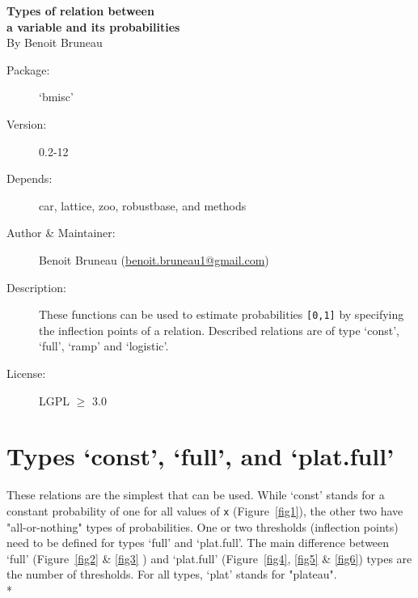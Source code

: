 \documentclass[letterpaper, 12pt]{article}
\begin{document}
\begin{titlepage}
\vspace*{3cm}
\begin{center}

\huge{\bf Types of relation between \\ a variable and its probabilities}\\

\vspace*{2cm}
\large{By Benoit Bruneau}
\end{center}
\vspace*{4cm}

\begin{description}
\item[Package:] `bmisc'
\item[Version:] 0.2-12
\item[Depends:] car, lattice, zoo, robustbase, and methods
\item[Author \& Maintainer:] Benoit Bruneau (\href{mailto:benoit.bruneau1@gmail.com}{benoit.bruneau1@gmail.com})
\item[Description:] These functions can be used to estimate probabilities \verb=[0,1]= by specifying the inflection points of a relation. Described relations are of type `const', `full', `ramp' and `logistic'.
\item[License:] LGPL $\geqslant$ 3.0
\end{description}


\vspace*{\fill}


\end{titlepage}

\tableofcontents
\newpage

\section{Types `const', `full', and `plat.full'}
\noindent These relations are the simplest that can be used. While `const' stands for a constant probability of one for all 
values of \verb#x# (Figure~\ref{fig1}), the other two have "all-or-nothing" types of probabilities. One or two thresholds 
(inflection points) need to be defined for types `full' and `plat.full'. The main difference between `full'
(Figure~\ref{fig2} \& \ref{fig3} ) 
and `plat.full' (Figure~\ref{fig4}, \ref{fig5} \& \ref{fig6}) types are the number of thresholds. For all types, `plat' stands for "plateau".\\*
\end{document}
